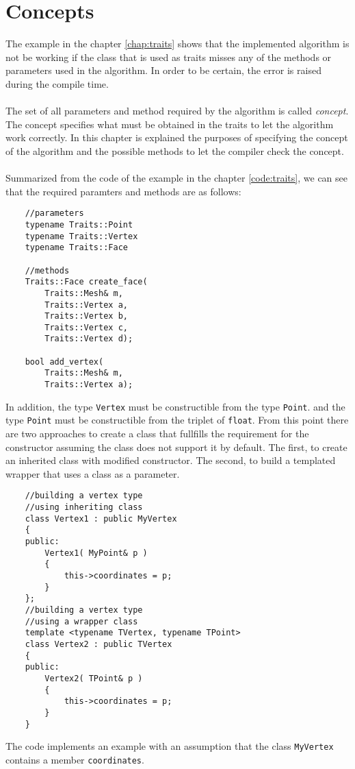 \chapter{Concepts}

The example in the chapter \ref{chap:traits} shows that the implemented algorithm
is not be working if the class that is used as traits misses any of the methods or parameters
used in the algorithm. In order to be certain, the error is raised during the compile time.\\
\\
The set of all parameters and method required by the algorithm is called \emph{concept}.
The concept specifies what must be obtained in the traits to let the algorithm work correctly.
In this chapter is explained the purposes of specifying the concept of the algorithm and the
possible methods to let the compiler check the concept.\\
\\
Summarized from the code of the example in the chapter \ref{code:traits}, we can see that the required
paramters and methods are as follows:

\begin{lstlisting}
	//parameters
	typename Traits::Point
	typename Traits::Vertex
	typename Traits::Face
	
	//methods
	Traits::Face create_face(
		Traits::Mesh& m,
		Traits::Vertex a,
		Traits::Vertex b,
		Traits::Vertex c,
		Traits::Vertex d);

	bool add_vertex(
		Traits::Mesh& m,
		Traits::Vertex a);
\end{lstlisting}
In addition, the type \texttt{Vertex} must be constructible from the type \texttt{Point}.
and the type \texttt{Point} must be constructible from the triplet of \texttt{float}.
From this point there are two approaches to create a class that fullfills the requirement
for the constructor assuming the class does not support it by default.
The first, to create an inherited class with modified constructor. The second,
to build a templated wrapper that uses a class as a parameter.
\label{code:constr1}
\begin{lstlisting}
	//building a vertex type
	//using inheriting class
	class Vertex1 : public MyVertex
	{
	public:
		Vertex1( MyPoint& p )
		{
			this->coordinates = p;
		}
	};
	//building a vertex type
	//using a wrapper class
	template <typename TVertex, typename TPoint>
	class Vertex2 : public TVertex
	{
	public:
		Vertex2( TPoint& p )
		{
			this->coordinates = p;
		}
	}
\end{lstlisting}
The code implements an example with an assumption that the class \texttt{MyVertex}
contains a member \texttt{coordinates}.

